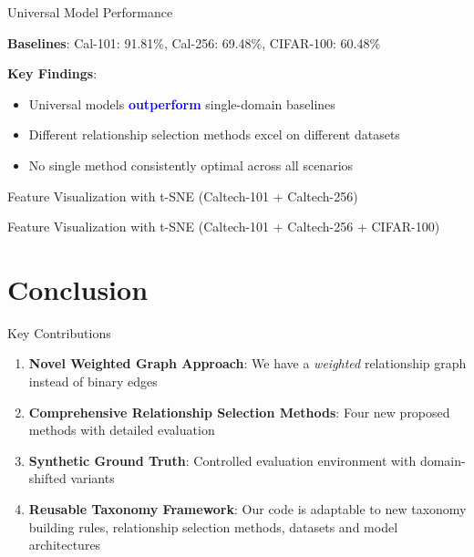 \documentclass[aspectratio=169]{beamer}
\begin{document}
\begin{frame}{Universal Model Performance}
    \vspace{0.5em}

    \textbf{Baselines}: Cal-101: 91.81\%, Cal-256: 69.48\%, CIFAR-100: 60.48\%

    \textbf{Key Findings}:
    \begin{itemize}
        \item Universal models \textcolor{blue}{\textbf{outperform}} single-domain baselines
        \item Different relationship selection methods excel on different datasets
        \item No single method consistently optimal across all scenarios
    \end{itemize}
\end{frame}

\begin{frame}{Feature Visualization with t-SNE (Caltech-101 + Caltech-256)}
    \begin{center}
        \resizebox{0.65\textwidth}{!}{}
    \end{center}
\end{frame}

\begin{frame}{Feature Visualization with t-SNE (Caltech-101 + Caltech-256 + CIFAR-100)}
    \begin{center}
        \resizebox{0.65\textwidth}{!}{}
    \end{center}
\end{frame}

\section{Conclusion}

\begin{frame}{Key Contributions}
    \begin{enumerate}
        \item \textbf{Novel Weighted Graph Approach}: We have a \textit{weighted} relationship graph instead of binary edges

        \item \textbf{Comprehensive Relationship Selection Methods}: Four new proposed methods with detailed evaluation

        \item \textbf{Synthetic Ground Truth}: Controlled evaluation environment with domain-shifted variants

        \item \textbf{Reusable Taxonomy Framework}: Our code is adaptable to new taxonomy building rules,
              relationship selection methods, datasets and model architectures
    \end{enumerate}
\end{frame}
\end{document}
